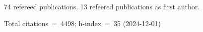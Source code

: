 74 refereed publications. 13 refeered publications as first author.

Total citations~=~4498; h-index~=~35 (2024-12-01)